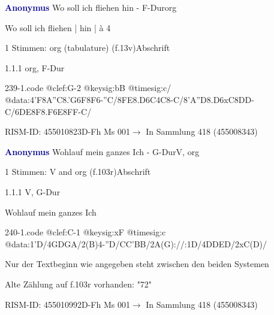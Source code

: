 \documentclass[twocolumn]{book}
\begin{document}
\par \vspace{7pt} \textcolor{darkblue}{\textbf{Anonymus  }}\hfillplus{\textbf{[239]}}\newline Wo soll ich fliehen hin - F-Dur\newline org
\par \begin{itshape}[f.13v, at left:] Wo soll ich fliehen | hin | à 4\end{itshape} 
\par \textcolor{darkblue}{}  1 Stimmen: org (tabulature)  (f.13v)\newline Abschrift
\par 1.1.1  org, F-Dur  
\begin{filecontents*}{239-1.code}
@clef:G-2
@keysig:bB
@timesig:c/
@data:4'F{8A''C}{8.'G6F}8F6-''C/{8FE8.D6C}4C8-C/{8'A''D8.D6xC}{8DD}-C/{6DE8F8.F6E}{8FF}-C/
\end{filecontents*}
\newline
%
\par RISM-ID: 455010823\newline D-Fh  Ms 001\newline $\rightarrow$ In Sammlung 418 (455008343)
      
\par \vspace{7pt} \textcolor{darkblue}{\textbf{Anonymus  }}\hfillplus{\textbf{[240]}}\newline Wohlauf mein ganzes Ich - G-Dur\newline V, org
\par \begin{itshape}\end{itshape} 
\par \textcolor{darkblue}{}  1 Stimmen: V and org  (f.103r)\newline Abschrift
\par 1.1.1  V, G-Dur\newline \begin{footnotesize} Wohlauf mein ganzes Ich \end{footnotesize}  
\begin{filecontents*}{240-1.code}
@clef:C-1
@keysig:xF
@timesig:c
@data:1'D/4GDGA/2(B)4-''D/CC'BB/2A(G)://:1D/4DDED/2xC(D)/
\end{filecontents*}
\newline
%
\par Nur der Textbeginn wie angegeben steht zwischen den beiden Systemen
\par Alte Zählung auf f.103r vorhanden: "72"
\par RISM-ID: 455010992\newline D-Fh  Ms 001\newline $\rightarrow$ In Sammlung 418 (455008343)
      
\end{document}
